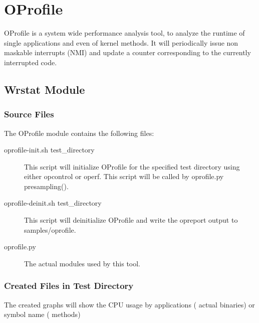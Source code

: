 \section{OProfile}
    OProfile is a system wide performance analysis tool, to analyze the runtime
    of single applications and even of kernel methods.
    It will periodically issue non maskable interrupts (NMI)
    and update a counter corresponding to the currently interrupted code.

\subsection{Wrstat Module}
    \subsubsection{Source Files}
    The OProfile module contains the following files:
    \begin{description}
        \item[oprofile-init.sh test\_directory]
            This script will initialize OProfile for the specified test directory
            using either opcontrol or operf.
            This script will be called by oprofile.py presampling().

        \item[oprofile-deinit.sh test\_directory]
            This script will deinitialize OProfile and write the opreport
            output to samples/oprofile.

        \item[oprofile.py]
            The actual modules used by this tool.

    \end{description}

    \subsubsection{Created Files in Test Directory}
    The created graphs will show the CPU usage by applications ( actual binaries)
    or symbol name ( methods)

